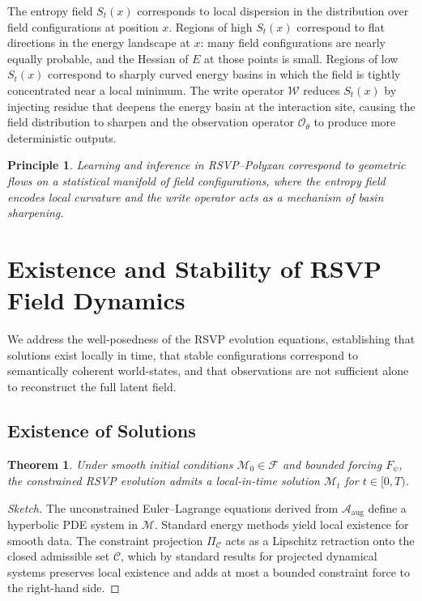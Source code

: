 \documentclass[11pt]{article}
\newtheorem{theorem}{Theorem}[section]
\newtheorem{principle}{Principle}
\begin{document}
The entropy field $S_t(x)$ corresponds to local dispersion in the
distribution over field configurations at position $x$.
Regions of high $S_t(x)$ correspond to flat directions in the energy
landscape at $x$: many field configurations are nearly equally probable,
and the Hessian of $E$ at those points is small.
Regions of low $S_t(x)$ correspond to sharply curved energy basins in
which the field is tightly concentrated near a local minimum.
The write operator $\mathcal{W}$ reduces $S_t(x)$ by injecting residue
that deepens the energy basin at the interaction site, causing the field
distribution to sharpen and the observation operator $\mathcal{O}_\theta$
to produce more deterministic outputs.

\begin{principle}
Learning and inference in RSVP--Polyxan correspond to geometric flows on
a statistical manifold of field configurations, where the entropy field
encodes local curvature and the write operator acts as a mechanism of
basin sharpening.
\end{principle}

\section{Existence and Stability of RSVP Field Dynamics}
\label{sec:stability}

We address the well-posedness of the RSVP evolution equations, establishing
that solutions exist locally in time, that stable configurations correspond
to semantically coherent world-states, and that observations are not
sufficient alone to reconstruct the full latent field.

\subsection{Existence of Solutions}

\begin{theorem}
Under smooth initial conditions $\mathcal{M}_0 \in \mathcal{F}$ and
bounded forcing $F_\psi$, the constrained RSVP evolution admits a
local-in-time solution $\mathcal{M}_t$ for $t \in [0, T)$.
\end{theorem}

\begin{proof}[Sketch]
The unconstrained Euler--Lagrange equations derived from
$\mathcal{A}_{\text{aug}}$ define a hyperbolic PDE system in $\mathcal{M}$.
Standard energy methods yield local existence for smooth data.
The constraint projection $\Pi_{\mathcal{C}}$ acts as a Lipschitz
retraction onto the closed admissible set $\mathcal{C}$, which by standard
results for projected dynamical systems preserves local existence and
adds at most a bounded constraint force to the right-hand side.
\end{proof}
\end{document}
